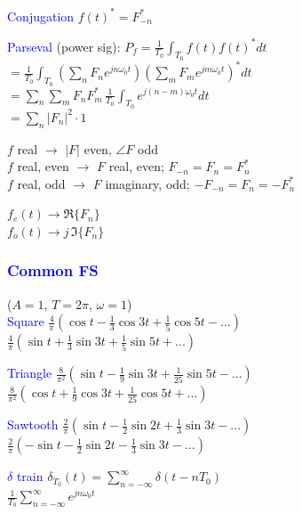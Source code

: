 \documentclass[4pt]{article}
\theoremstyle{definition}
\theoremstyle{definition}
\renewcommand{\o}{\omega}
\newcommand{\ra}{\rightarrow}
\newcommand{\blue}[1]{\textcolor{blue}{#1}}
\begin{document}
\begin{landscape}
\begin{multicols}{3}
    \blue{Conjugation} $f(t)^* = F^*_{-n}$

    \blue{Parseval} (power sig): \(P_f = \frac 1{T_0}\int_{T_0} f(t) f(t)^* dt\)\\
        \hspace{1em} \(=\frac{1}{T_0}\int_{T_0} (\sum_n F_n e^{jn\o_0t})(\sum_m F_m e^{jm\o_0t})^* dt\)\\
        \hspace{1em} \(=\sum_n \sum_m  F_n F_m^* \, \frac{1}{T_0}\int_{T_0} e^{j(n-m)\o_0t} dt\)\\
        \hspace{1em} \(=\sum_n |F_n|^2 \cdot 1\)

        $f$ real $\ra$ $|F|$ even, $\angle F$ odd\\
        $f$ real, even $\ra$ $F$ real, even; $F_{-n} = F_n = F_n^*$\\
        $f$ real, odd $\ra$ $F$ imaginary, odd; $-F_{-n} = F_n = -F_n^*$

        $f_e(t) \ra \Re\{ F_n\}$\\
        $f_o(t) \ra j \,\Im \{F_n\}$
\columnbreak
\subsubsection*{\blue{Common FS}}
    ($A=1$, $T=2\pi$, $\omega = 1$)\\
    \blue{Square}  
        $\frac{4}{\pi}(\cos t - \frac{1}{3}\cos 3t + \frac{1}{5} \cos 5t- ...)$\\
        $\frac{4}{\pi}(\sin t + \frac 1 3 \sin 3t + \frac 1 5 \sin 5t + ...)$

    \blue{Triangle} 
        $\frac{8}{\pi^2}(\sin t - \frac{1}{9} \sin 3t + \frac{1}{25} \sin 5t - ...)$\\
        $\frac{8}{\pi^2}(\cos t + \frac 1 9 \cos 3t + \frac 1 {25} \cos 5t + ...)$

    \blue{Sawtooth}   
        $\frac 2{\pi} (\sin t - \frac{1}{2} \sin 2t + \frac{1}{3} \sin 3t - ...)$\\
        $\frac 2{\pi} (-\sin t - \frac{1}{2} \sin 2t - \frac{1}{3} \sin 3t - ...)$

    \blue{$\delta$ train}    
        $\delta_{T_0} (t) = \sum_{n=-\infty}^{\infty} \delta(t - nT_0)$ \\
        $\frac{1}{T_0} \sum_{n=-\infty}^{\infty} e^{jn\omega_0 t}$


\end{multicols}
\end{landscape}
\end{document}
